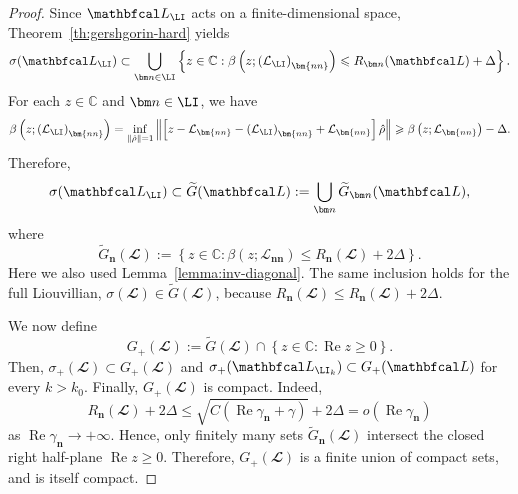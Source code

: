 \documentclass{SciPost}
\renewcommand{\Re}{\operatorname{Re}}
\begin{document}
\begin{proof}
    Since \(\mathbfcal L_\LI\) acts on a finite-dimensional space, Theorem~\ref{th:gershgorin-hard} yields
    \begin{equation}
        \sigma(\mathbfcal L_\LI) \subset \bigcup_{\bm n \in \LI}
        \left \{
            z \in \mathbb C: 
            \beta\left(
                z; \left(\mathcal L_\LI\right)_{\bm{nn}}
            \right) \leqslant R_{\bm n}(\mathbfcal L) + \Delta
        \right \}.
    \end{equation}
    For each $z \in \mathbb C$ and $\bm n \in \LI$, we have
    \begin{equation}
        \beta\left(z; \left(\mathcal L_\LI\right)_{\bm{nn}}\right) = 
        \inf_{\| \hat \rho \| = 1} \left\|
            \left[
                z - \mathcal L_{\bm{nn}}
                - \left(\mathcal L_\LI\right)_{\bm{nn}}
                +  \mathcal L_{\bm{nn}}
            \right]\hat \rho
        \right\| \geqslant 
        \beta \left(z; \mathcal L_{\bm{nn}}\right) - \Delta.
    \end{equation}
    Therefore,
    \begin{equation}
        \sigma(\mathbfcal L_\LI) \subset \widetilde{G}(\mathbfcal L) :=
        \bigcup_{\bm n}\widetilde{G}_{\bm n}(\mathbfcal L),
    \end{equation}
    where
    \begin{equation}
        \widetilde{G}_{\bm n}(\mathbfcal L) :=
        \left \{
            z \in \mathbb C: 
            \beta(z; \mathcal L_{\bm{nn}})
            \leqslant R_{\bm n}(\mathbfcal L) + 2 \Delta
        \right \}.
    \end{equation}
    Here we also used Lemma~\ref{lemma:inv-diagonal}. The same inclusion holds for the full Liouvillian,
    $\sigma(\mathbfcal L) \in \widetilde G(\mathbfcal L)$,
    because \(R_{\bm n}(\mathbfcal L) \leqslant R_{\bm n}(\mathbfcal L)+2 \Delta\).

    We now define
    \begin{equation}
        G_+(\mathbfcal L) := \widetilde G(\mathbfcal L) \cap \left \{
            z \in \mathbb C : \Re z \geqslant 0
        \right\}.
    \end{equation}
    Then,
    $\sigma_+(\mathbfcal L) \subset G_+(\mathbfcal L)$
    and
    $\sigma_+(\mathbfcal L_{\LI_k}) \subset G_+(\mathbfcal L)$ for every $k>k_0$.
    Finally, \(G_+(\mathbfcal L)\) is compact. Indeed,
    \begin{equation}
        R_{\bm n}(\mathbfcal L) + 2\Delta
        \leqslant
        \sqrt{C(\Re \gamma_{\bm n}+\gamma)} + 2\Delta
        =
        o(\Re \gamma_{\bm n})
    \end{equation}
    as \(\Re \gamma_{\bm n}\to+\infty\). Hence, only finitely many sets \(\widetilde G_{\bm n}(\mathbfcal L)\) intersect the closed right half-plane \(\Re z \geqslant 0\). Therefore, \(G_+(\mathbfcal L)\) is a finite union of compact sets, and is itself compact.
\end{proof}


%
\end{document}
